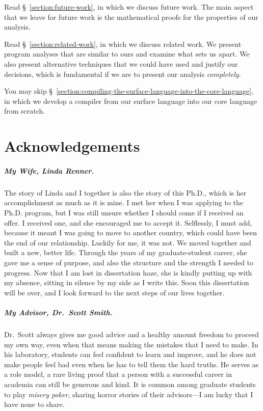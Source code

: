 \documentclass[12pt, oneside]{book}
\begin{document}
Read §~\ref{section:future-work}, in which we discuss future work. The main aspect that we leave for future work is the mathematical proofs for the properties of our analysis.

Read §~\ref{section:related-work}, in which we discuss related work. We present program analyses that are similar to ours and examine what sets us apart. We also present alternative techniques that we could have used and justify our decisions, which is fundamental if we are to present our analysis \emph{completely}.

You may skip §~\ref{section:compiling-the-surface-language-into-the-core-language}, in which we develop a compiler from our surface language into our core language from scratch.

\chapter{Acknowledgements}

\paragraph{My Wife, Linda Renner.}

The story of Linda and I together is also the story of this Ph.D., which is her accomplishment as much as it is mine. I met her when I was applying to the Ph.D. program, but I was still unsure whether I should come if I received an offer. I received one, and she encouraged me to accept it. Selflessly, I must add, because it meant I was going to move to another country, which could have been the end of our relationship. Luckily for me, it was not. We moved together and built a new, better life. Through the years of my graduate-student career, she gave me a sense of purpose, and also the structure and the strength I needed to progress. Now that I am lost in dissertation haze, she is kindly putting up with my absence, sitting in silence by my side as I write this. Soon this dissertation will be over, and I look forward to the next steps of our lives together.

\paragraph{My Advisor, Dr.~Scott Smith.}

Dr.~Scott always gives me good advice and a healthy amount freedom to proceed my own way, even when that means making the mistakes that I need to make. In his laboratory, students can feel confident to learn and improve, and he does not make people feel bad even when he has to tell them the hard truths. He serves as a role model, a rare living proof that a person with a successful career in academia can still be generous and kind. It is common among graduate students to play \emph{misery poker}, sharing horror stories of their advisors—I am lucky that I have none to share.
\end{document}
